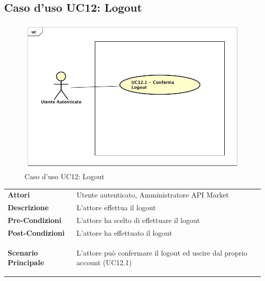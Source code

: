 \newpage
\subsection{Caso d'uso UC12: Logout}
\label{UC12}
\begin{figure}[ht]
	\centering
	\includegraphics[scale=0.45]{UML/UC12.png}
	\caption{Caso d'uso UC12: Logout}
\end{figure}

\renewcommand*{\arraystretch}{1.6}
\begin{longtable}{ l | p{11cm}}
	\hline
	\rowcolor{Gray}
	\multicolumn{2}{c}{UC12 - Logout} \\
	\hline
	\textbf{Attori} &Utente autenticato, Amministratore API Market \\
	\textbf{Descrizione} &L'attore effettua il logout \\
	\textbf{Pre-Condizioni} &L'attore ha scelto di effettuare il logout\\
	\textbf{Post-Condizioni}&L'attore ha effettuato il logout\\
	\textbf{Scenario Principale} & \begin{enumerate*}[label=(\arabic*.),itemjoin={\newline}]
		\item L'attore può confermare il logout ed uscire dal proprio account (UC12.1)
	\end{enumerate*}\\
\end{longtable}

